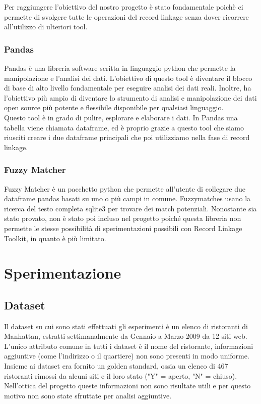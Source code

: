 \documentclass[a4paper,12pt]{article}
\begin{document}
\noindent Per raggiungere l'obiettivo del nostro progetto è stato fondamentale poichè ci permette di svolgere tutte le operazioni del record linkage senza dover ricorrere all'utilizzo di ulteriori tool.

\subsubsection{Pandas}
Pandas è una libreria software scritta in linguaggio python che permette la manipolazione e l'analisi dei dati. L'obiettivo di questo tool è diventare il blocco di base di alto livello fondamentale per eseguire analisi dei dati reali. Inoltre, ha l'obiettivo più ampio di diventare lo strumento di analisi e manipolazione dei dati open source più potente e flessibile disponibile per qualsiasi linguaggio.\\

\noindent Questo tool è in grado di pulire, esplorare e elaborare i dati. In Pandas una tabella viene chiamata dataframe, ed è proprio grazie a questo tool che siamo riusciti  creare i due dataframe principali che poi utilizziamo nella fase di record linkage.

\subsubsection{Fuzzy Matcher}
Fuzzy Matcher è un pacchetto python che permette all'utente di collegare due dataframe pandas basati su uno o più campi in comune. Fuzzymatches usano la ricerca del testo completa sqlite3 per trovare dei match potenziali. Nonostante sia stato provato, non è stato poi incluso nel progetto poiché questa libreria non permette le stesse possibilità di sperimentazioni possibili con Record Linkage Toolkit, in quanto è più limitato.

\newpage
\section{Sperimentazione}

\subsection{Dataset}
Il dataset su cui sono stati effettuati gli esperimenti è un elenco di ristoranti di Manhattan, estratti settimanalmente da Gennaio a Marzo 2009 da 12 siti web. L'unico attributo comune in tutti i dataset è il nome del ristorante, informazioni aggiuntive (come l'indirizzo o il quartiere) non sono presenti in modo uniforme.
Insieme ai dataset era fornito un golden standard, ossia un elenco di 467 ristoranti rimossi da alcuni siti e il loro stato ("Y" = aperto, "N" = chiuso). Nell'ottica del progetto queste informazioni non sono risultate utili e per questo motivo non sono state sfruttate per analisi aggiuntive.
\end{document}
